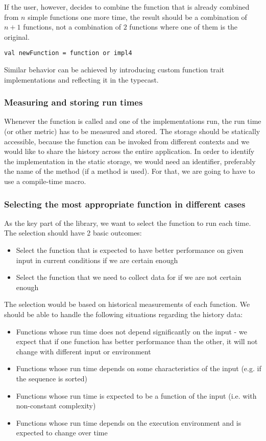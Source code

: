 If the user, however, decides to combine the function that is already combined from $n$ simple functions one more time, the result should be a combination of $n+1$ functions, not a combination of $2$ functions where one of them is the original.

\lstset{style=Scala}
\begin{lstlisting}
val newFunction = function or impl4
\end{lstlisting}

Similar behavior can be achieved by introducing custom function trait implementations and reflecting it in the typecast.

\subsubsection{Measuring and storing run times}

Whenever the function is called and one of the implementations run, the run time (or other metric) has to be measured and stored. The storage should be statically accessible, because the function can be invoked from different contexts and we would like to share the history across the entire application. In order to identify the implementation in the static storage, we would need an identifier, preferably the name of the method (if a method is used). For that, we are going to have to use a compile-time macro.

\subsubsection{Selecting the most appropriate function in different cases}

As the key part of the library, we want to select the function to run each time. The selection should have 2 basic outcomes:

\begin{itemize}
	\item Select the function that is expected to have better performance on given input in current conditions if we are certain enough
	\item Select the function that we need to collect data for if we are not certain enough
\end{itemize}

The selection would be based on historical measurements of each function. We should be able to handle the following situations regarding the history data:

\begin{itemize}
	\item Functions whose run time does not depend significantly on the input - we expect that if one function has better performance than the other, it will not change with different input or environment
	\item Functions whose run time depends on some characteristics of the input (e.g. if the sequence is sorted)
	\item Functions whose run time is expected to be a function of the input (i.e. with non-constant complexity)
	\item Functions whose run time depends on the execution environment and is expected to change over time
\end{itemize}

